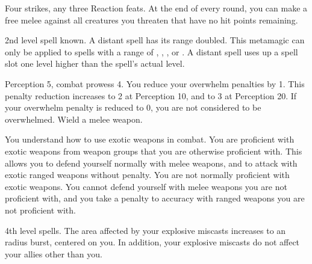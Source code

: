 \featpres Four strikes, any three Reaction feats.
\featben At the end of every round, you can make a free melee  against all creatures you threaten that have no hit points remaining.

\featpre 2nd level spell known.
\featben A distant spell has its range doubled.
This metamagic can only be applied to spells with a range of \rngclose, \rngmed, \rnglong, or \rngext.
A distant spell uses up a spell slot one level higher than the spell's actual level.

\featpre Perception 5, combat prowess 4.
\featben You reduce your overwhelm penalties by 1.
This penalty reduction increases to 2 at Perception 10, and to 3 at Perception 20.
If your overwhelm penalty is reduced to 0, you are not considered to be overwhelmed.
\featpre Wield a melee weapon.

You understand how to use exotic weapons in combat.
\featben You are proficient with exotic weapons from weapon groups that you are otherwise proficient with.
This allows you to defend yourself normally with melee weapons, and to attack with exotic ranged weapons without penalty.
You are not normally proficient with exotic weapons.
You cannot defend yourself with melee weapons you are not proficient with, and you take a  penalty to accuracy with ranged weapons you are not proficient with.

\featpre 4th level spells.
\featben The area affected by your explosive miscasts increases to an \areasmall radius burst, centered on you.
In addition, your explosive miscasts do not affect your allies other than you.

